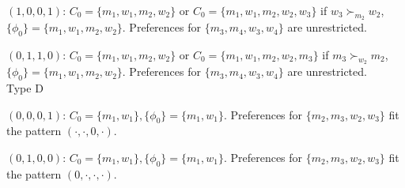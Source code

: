 \documentclass[WP]{AEA}
\begin{document}
$(1,0,0,1)$:  $C_0 =\{m_1,w_1,m_2,w_2\}$ or $C_0 =\{m_1,w_1,m_2,w_2, w_3\}$ if $w_3\succ_{m_2} w_2$, $\{\phi_0\}=\{m_1,w_1,m_2,w_2\}$.  Preferences for $\{m_3,m_4,w_3,w_4\}$ are unrestricted. 

$(0,1,1,0)$:  $C_0 =\{m_1,w_1,m_2,w_2\}$ or $C_0 =\{m_1,w_1,m_2,w_2, m_3\}$ if $m_3\succ_{w_2} m_2$, $\{\phi_0\}=\{m_1,w_1,m_2,w_2\}$.  Preferences for $\{m_3,m_4,w_3,w_4\}$ are unrestricted. 
\\


Type D

$(0,0,0,1)$:  $C_0 =\{m_1,w_1\}, \{\phi_0\}=\{m_1,w_1\}$.  Preferences for $\{m_2,m_3,w_2,w_3\}$ fit the pattern $(\cdot,\cdot,0,\cdot)$.


$(0,1,0,0)$:  $C_0 =\{m_1,w_1\}, \{\phi_0\}=\{m_1,w_1\}$.  Preferences for $\{m_2,m_3,w_2,w_3\}$ fit the pattern $(0,\cdot,\cdot,\cdot)$.
\end{document}
